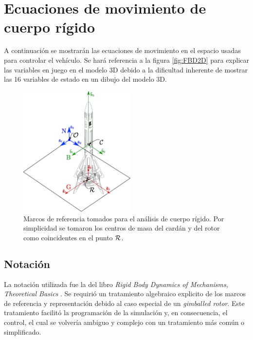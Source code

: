 
\section{Ecuaciones de movimiento de cuerpo rígido} \label{sec:ecuacionesRigid}
A continuación se mostrarán las ecuaciones de movimiento en el espacio usadas para controlar el vehículo.
Se hará referencia a la figura \ref{fig:FBD2D} para explicar las variables en juego en el modelo 3D debido a la dificultad inherente de mostrar las 16 variables de estado en un dibujo del modelo 3D.

\begin{figure}[htb!]
	\centering
	\includegraphics[width=0.52\textwidth]{fig/marcosDiagrama.eps}
	\caption{Marcos de referencia tomados para el análisis de cuerpo rígido. Por simplicidad se tomaron los centros de masa del cardán y del rotor como coincidentes en el punto $\mathcal{R}$.}
\end{figure}

\newpage
\subsection{Notación}

La notación utilizada fue la del libro \textit{Rigid Body Dynamics of Mechanisms, Theoretical Basics} \cite{hahn2013rigid}. Se requirió un tratamiento algebraico explicito de los marcos de referencia y representación debido al caso especial de un \textit{gimballed rotor}. Este tratamiento facilitó la programación de la simulación y, en consecuencia, el control, el cual se volvería ambiguo y complejo con un tratamiento más común o simplificado.

